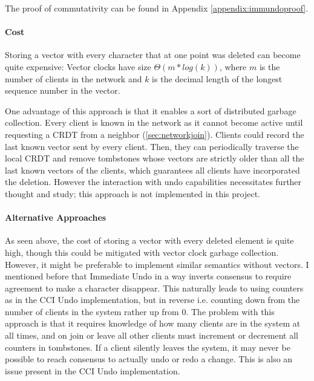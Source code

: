 \documentclass[12pt,a4paper,twoside,openright]{report}
\begin{document}
			The proof of commutativity can be found in Appendix \ref{appendix:immundoproof}.
			
			
			\paragraph{Cost} \label{sec:immundo:cost}
			Storing a vector with every character that at one point was deleted can become quite expensive: Vector clocks have size $\Theta (m*log(k))$, where $m$ is the number of clients in the network and $k$ is the decimal length of the longest sequence number in the vector.
			
			One advantage of this approach is that it enables a sort of distributed garbage collection. Every client is known in the network as it cannot become active until requesting a CRDT from a neighbor (\cref{sec:networkjoin}). Clients could record the last known vector sent by every client. Then, they can periodically traverse the local CRDT and remove tombstones whose vectors are strictly older than all the last known vectors of the clients, which guarantees all clients have incorporated the deletion. However the interaction with undo capabilities necessitates further thought and study; this approach is not implemented in this project.
			
			
			\paragraph{Alternative Approaches}
			As seen above, the cost of storing a vector with every deleted element is quite high, though this could be mitigated with vector clock garbage collection. However, it might be preferable to implement similar semantics without vectors. I mentioned before that Immediate Undo in a way inverts consensus to require agreement to make a character disappear. This naturally leads to using counters as in the CCI Undo implementation, but in reverse i.e. counting down from the number of clients in the system rather up from 0. The problem with this approach is that it requires knowledge of how many clients are in the system at all times, and on join or leave all other clients must increment or decrement all counters in tombstones. If a client silently leaves the system, it may never be possible to reach consensus to actually undo or redo a change. This is also an issue present in the CCI Undo implementation.
			
		
	
\end{document}
